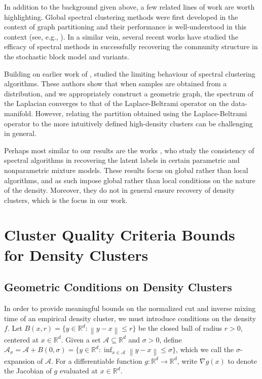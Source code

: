 \documentclass{article}
\newcommand{\Reals}{\mathbb{R}}
\newcommand{\Rd}{\Reals^d}
\newcommand{\norm}[1]{\left\lVert#1\right\rVert}
\newcommand{\1}{\mathbf{1}}
\newcommand{\Aset}{\mathcal{A}}
\newcommand{\Asig}{\Aset_{\sigma}}
\theoremstyle{aldenthm}
\theoremstyle{aldenrmrk}
\begin{document}
In addition to the background given above, a few related lines of work are worth
highlighting.
Global spectral clustering methods were first developed in the
context of graph partitioning \citep{fiedler1973,donath1973} and their
performance is well-understood in this context (see, e.g.,
\citealt{tolliver2006,luxburg2007}).  In a similar vein, several recent works
\citep{mcsherry2001,rohe2011,kamalika2012,balakrishnan2011,lei2015,abbe2018} 
have studied the efficacy of spectral methods in successfully recovering the
community structure in the stochastic block model and variants.

Building on earlier work of
\citep{koltchinskii2000}, \citep{vonluxburg2008,hein2005} studied the limiting behaviour of spectral clustering
algorithms. These authors show that when samples are obtained from a
distribution, and we appropriately construct a geometric graph, the spectrum of
the Laplacian converges to that of the Laplace-Beltrami operator on the
data-manifold. However, relating the partition obtained using the
Laplace-Beltrami operator to the more intuitively defined high-density
clusters can be challenging in general.



Perhaps most similar to our results are the works
\citep{vempala2004,shi2009,schiebinger2015}, who study the consistency of
spectral algorithms in recovering the latent labels in certain parametric and
nonparametric mixture models. These results focus on global rather than local
algorithms, and as such impose global rather than local conditions on the nature
of the density. Moreover, they do not in general ensure recovery of density
clusters, which is the focus in our work. 

\section{Cluster Quality Criteria Bounds for Density Clusters}  
\label{sec: cluster_quality_bounds}

\subsection{Geometric Conditions on Density Clusters}

In order to provide meaningful bounds on the normalized cut and inverse mixing
time of an empirical density cluster, we must introduce conditions on the
density $f$. Let $B(x,r) = \{y \in \Rd: \norm{y - x} \leq r\}$ be the closed
ball of radius $r > 0$, centered at $x \in \Rd$.  Given a set $\Aset
\subseteq \Rd$ and $\sigma > 0$, define $\Asig = \Aset + B(0,\sigma) = \{y \in
\Rd: \inf_{x \in \Aset} \norm{y - x} \leq \sigma\}$, which we call the
$\sigma$-expansion of $\Aset$. For a differentiable function $g: \Rd \to \Rd$, write $\nabla g(x)$ to denote the Jacobian of $g$ evaluated at $x \in \Rd$. 
\end{document}
